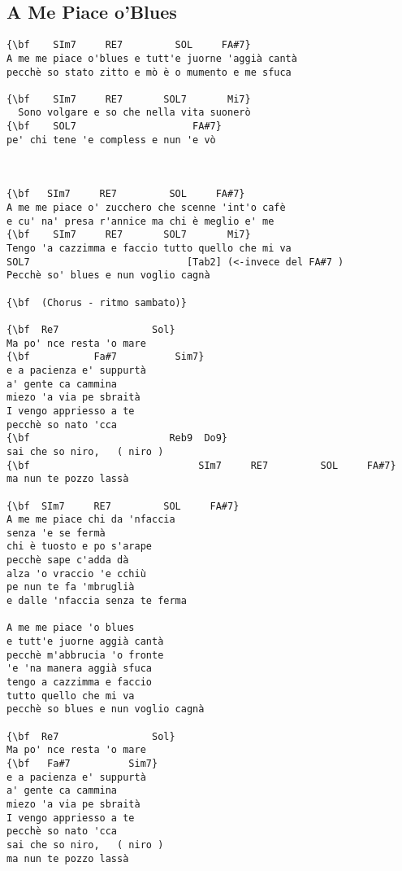 \documentclass[a4paper]{article}
\begin{document}
\subsection{A Me Piace o'Blues}
\begin{Verbatim}[commandchars=\\\{\}]
{\bf    SIm7     RE7         SOL     FA#7}
A me me piace o'blues e tutt'e juorne 'aggià cantà
pecchè so stato zitto e mò è o mumento e me sfuca

{\bf    SIm7     RE7       SOL7       Mi7}
  Sono volgare e so che nella vita suonerò
{\bf    SOL7      			    FA#7}
pe' chi tene 'e compless e nun 'e vò



{\bf   SIm7     RE7         SOL     FA#7}
A me me piace o' zucchero che scenne 'int'o cafè
e cu' na' presa r'annice ma chi è meglio e' me
{\bf    SIm7     RE7       SOL7       Mi7}
Tengo 'a cazzimma e faccio tutto quello che mi va
SOL7                           [Tab2] (<-invece del FA#7 )
Pecchè so' blues e nun voglio cagnà

{\bf  (Chorus - ritmo sambato)}

{\bf  Re7                Sol}
Ma po' nce resta 'o mare
{\bf           Fa#7          Sim7}
e a pacienza e' suppurtà
a' gente ca cammina
miezo 'a via pe sbraità
I vengo appriesso a te
pecchè so nato 'cca
{\bf                        Reb9  Do9}
sai che so niro,   ( niro )
{\bf                             SIm7     RE7         SOL     FA#7}
ma nun te pozzo lassà

{\bf  SIm7     RE7         SOL     FA#7}
A me me piace chi da 'nfaccia
senza 'e se fermà
chi è tuosto e po s'arape
pecchè sape c'adda dà
alza 'o vraccio 'e cchiù
pe nun te fa 'mbruglià
e dalle 'nfaccia senza te ferma

A me me piace 'o blues
e tutt'e juorne aggià cantà
pecchè m'abbrucia 'o fronte
'e 'na manera aggià sfuca
tengo a cazzimma e faccio
tutto quello che mi va
pecchè so blues e nun voglio cagnà

{\bf  Re7                Sol}
Ma po' nce resta 'o mare
{\bf   Fa#7          Sim7}
e a pacienza e' suppurtà
a' gente ca cammina
miezo 'a via pe sbraità
I vengo appriesso a te
pecchè so nato 'cca
sai che so niro,   ( niro )
ma nun te pozzo lassà

\end{Verbatim}
\newpage
\end{document}
